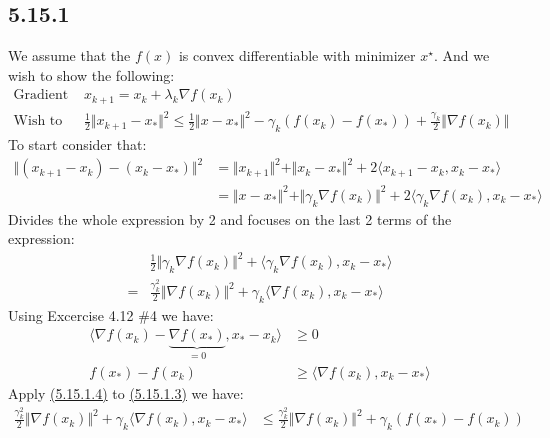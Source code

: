 \documentclass[]{article}
\begin{document}
    \subsection*{5.15.1}
        We assume that the $f(x)$ is convex differentiable with minimizer $x^\star$. And we wish to show the following: 
        \begin{align*}\tag{5.15.1.1}\label{eqn:5.15.1.1}
            \text{Gradient Update: } & 
            x_{k + 1} = x_{k} + \lambda_k \nabla f(x_k)
            \\
            \text{Wish to prove: } &
            \frac{1}{2}\Vert x_{k + 1} - x_*\Vert^2 \le 
            \frac{1}{2}\Vert x - x_*\Vert^2 - \gamma_k (f(x_k) - f(x_*)) + 
            \frac{\gamma_k}{2}\Vert \nabla f(x_k)\Vert
        \end{align*}
        To start consider that: 
        \begin{align*}\tag{5.15.1.2}\label{eqn:5.15.1.2}
            \Vert (x_{k + 1} - x_k) - (x_k - x_*)\Vert^2 
            &= 
            \Vert x_{k + 1}\Vert^2 + \Vert x_k - x_*\Vert^2 + 
            2 \langle x_{k + 1} - x_k, x_k - x_*\rangle
            \\
            &= 
            \Vert x - x_*\Vert^2 + \Vert \gamma_k \nabla f(x_k)\Vert^2 
            + 2 \langle \gamma_k \nabla f(x_k), x_k - x_*\rangle
        \end{align*}
        Divides the whole expression by 2 and focuses on the last 2 terms of the expression: 
        \begin{align*}\tag{5.15.1.3}\label{eqn:5.15.1.3}
            & \frac{1}{2}\Vert \gamma_k \nabla f(x_k) \Vert^2 + 
            \langle 
                \gamma_k\nabla f(x_k), x_k - x_*
            \rangle
            \\
            =& \frac{\gamma_k^2}{2}\Vert \nabla f(x_k) \Vert^2 + 
            \gamma_k\langle 
                \nabla f(x_k), x_k - x_*
            \rangle
        \end{align*}
        Using Excercise 4.12 \#4 we have: 
        \begin{align*}\tag{5.15.1.4}\label{eqn:5.15.1.4}
            \langle \nabla f(x_k) - \underbrace{\nabla f(x_*)}_{=0}, x_* - x_k \rangle &\ge 0 
            \\
            f(x_*) - f(x_k) &\ge \langle \nabla f(x_k), x_k - x_*\rangle
        \end{align*}
        Apply \hyperref[eqn:5.15.1.4]{(5.15.1.4)} to \hyperref[eqn:5.15.1.3]{(5.15.1.3)} we have: 
        \begin{align*}\tag{5.15.1.5}\label{eqn:5.15.1.5}
            \frac{\gamma_k^2}{2}\Vert \nabla f(x_k) \Vert^2 + 
            \gamma_k\langle 
                \nabla f(x_k), x_k - x_*
            \rangle
            & \le 
            \frac{\gamma_k^2}{2} \Vert \nabla f(x_k)\Vert^2 + 
            \gamma_k (f(x_*) - f(x_k))
        \end{align*}
\end{document}
